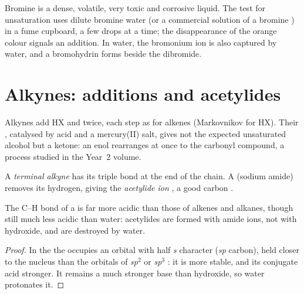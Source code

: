 \begin{inthelab}
Bromine is a dense, volatile, very toxic and corrosive liquid. The test
for unsaturation uses dilute bromine water (or a commercial solution of a
bromine ) in a fume cupboard, a few drops at a time; the
disappearance of the orange colour signals an addition. In water, the
bromonium ion is also captured by water, and a bromohydrin forms beside
the dibromide.
\end{inthelab}

\section{Alkynes: additions and acetylides}

Alkynes add HX and  twice, each step as for alkenes (Markovnikov
for HX). Their , catalysed by acid and a mercury(II) salt, gives
not the expected unsaturated alcohol but a ketone: an enol rearranges at
once to the carbonyl compound, a process studied in the Year~2 volume.

\begin{definition}\label{def:b1:electrophilic-additions:acetylide}
A \emph{terminal alkyne}  has its
triple bond at the end of the chain. A  (sodium amide)
removes its hydrogen, giving the \emph{acetylide ion}
, a good carbon .
\end{definition}

\begin{proposition}\label{prop:b1:electrophilic-additions:acetylide-acidity}
The C--H bond of a  is far more acidic than those of
alkenes and alkanes, though still much less acidic than water: acetylides
are formed with amide ions, not with hydroxide, and are destroyed by water.
\end{proposition}

\begin{proof}
In the  the  occupies an orbital with half
\textit{s} character (\textit{sp} carbon), held closer to the nucleus than
the orbitals of \textit{sp}$^2$ or \textit{sp}$^3$ : it is more
stable, and its conjugate acid stronger. It remains a much stronger base
than hydroxide, so water protonates it.
\end{proof}

